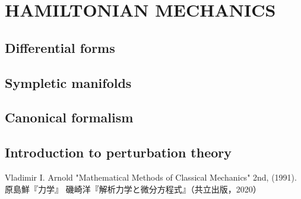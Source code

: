 \documentclass[uplatex, 12pt, dvipdfmx]{jsreport}
\begin{document}
\part{HAMILTONIAN MECHANICS}

\chapter{Differential forms}

\chapter{Sympletic manifolds}

\chapter{Canonical formalism}

\chapter{Introduction to perturbation theory}

\begin{thebibliography}{99}
    Vladimir I. Arnold "Mathematical Methods of Classical Mechanics" 2nd, (1991).
    原島鮮『力学』
    磯崎洋『解析力学と微分方程式』（共立出版，2020）
\end{thebibliography}
\end{document}
